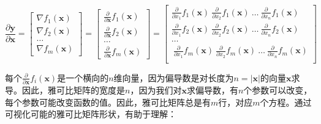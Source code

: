 \documentclass[11pt]{article}
\begin{document}
\[
\frac{\partial \mathbf{y}}{\partial \mathbf{x}} = \begin{bmatrix}
\nabla f_1(\mathbf{x}) \\
\nabla f_2(\mathbf{x})\\
\ldots\\
\nabla f_m(\mathbf{x})
\end{bmatrix} = \begin{bmatrix}
\frac{\partial}{\partial \mathbf{x}} f_1(\mathbf{x}) \\
\frac{\partial}{\partial \mathbf{x}} f_2(\mathbf{x})\\
\ldots\\
\frac{\partial}{\partial \mathbf{x}} f_m(\mathbf{x})
\end{bmatrix} = \begin{bmatrix}
\frac{\partial}{\partial {x_1}} f_1(\mathbf{x})~ \frac{\partial}{\partial {x_2}} f_1(\mathbf{x}) ~\ldots~ \frac{\partial}{\partial {x_n}} f_1(\mathbf{x}) \\
\frac{\partial}{\partial {x_1}} f_2(\mathbf{x})~ \frac{\partial}{\partial {x_2}} f_2(\mathbf{x}) ~\ldots~ \frac{\partial}{\partial {x_n}} f_2(\mathbf{x}) \\
\ldots\\
~\frac{\partial}{\partial {x_1}} f_m(\mathbf{x})~ \frac{\partial}{\partial {x_2}} f_m(\mathbf{x}) ~\ldots~ \frac{\partial}{\partial {x_n}} f_m(\mathbf{x}) \\
\end{bmatrix}
\]

每个$\frac{\partial}{\partial \mathbf{x}} f_i(\mathbf{x})$是一个横向的$n$维向量，因为偏导数是对长度为$n = |\mathbf{x}|$的向量$\mathbf{x}$求导。因此，雅可比矩阵的宽度是$n$，因为我们对$\mathbf{x}$求偏导数，有$n$个参数可以改变，每个参数可能改变函数的值。因此，雅可比矩阵总是有$m$行，对应$m$个方程。通过可视化可能的雅可比矩阵形状，有助于理解：
\end{document}
